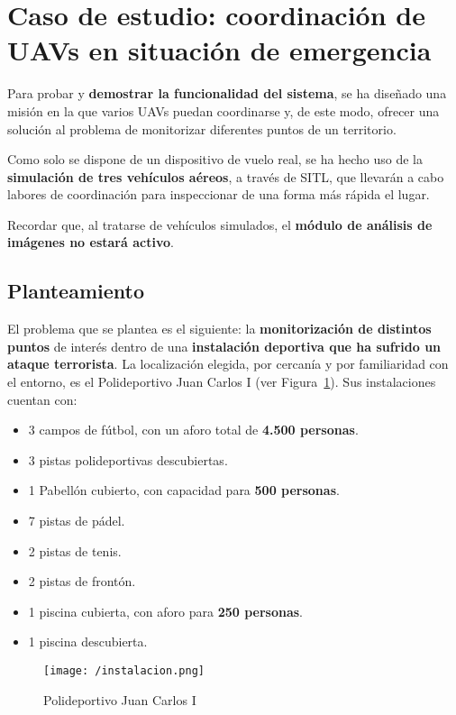 \section{Caso de estudio: coordinación de \acs{UAV}s en situación de emergencia}

Para probar y \textbf{demostrar la funcionalidad del sistema}, se ha diseñado una misión en la que varios \acs{UAV}s puedan coordinarse y, de este modo, ofrecer una solución al problema de monitorizar diferentes puntos de un territorio.

Como solo se dispone de un dispositivo de vuelo real, se ha hecho uso de la \textbf{simulación de tres vehículos aéreos}, a través de \acs{SITL}, que llevarán a cabo labores de coordinación para inspeccionar de una forma más rápida el lugar.

Recordar que, al tratarse de vehículos simulados, el \textbf{módulo de análisis de imágenes no estará activo}. 


\subsection{Planteamiento}

El problema que se plantea es el siguiente: la \textbf{monitorización de distintos puntos} de interés dentro de una \textbf{instalación deportiva que ha sufrido un ataque terrorista}. La localización elegida, por cercanía y por familiaridad con el entorno, es el Polideportivo Juan Carlos I (ver Figura~\ref{fig:instalacion}). Sus instalaciones cuentan con:
\begin{itemize}
\item 3 campos de fútbol, con un aforo total de \textbf{4.500 personas}.
\item 3 pistas polideportivas descubiertas.
\item 1 Pabellón cubierto, con capacidad para \textbf{500 personas}.
\item 7 pistas de pádel.
\item 2 pistas de tenis.
\item 2 pistas de frontón.
\item 1 piscina cubierta, con aforo para \textbf{250 personas}.
\item 1 piscina descubierta.
\end{itemize}

\begin{figure}[!h]
\begin{center}
\texttt{[image: /instalacion.png]}
\caption[Polideportivo Juan Carlos I]{Polideportivo Juan Carlos I}
\label{fig:instalacion}
\end{center}
\end{figure}

